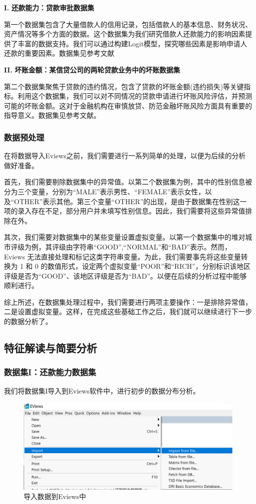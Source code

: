 \documentclass[13.5pt,hyperref,a4paper,UTF8]{ctexart}
\begin{document}
\quad \textbf{I.} \quad \textbf{还款能力：贷款审批数据集}

第一个数据集包含了大量借款人的信用记录，包括借款人的基本信息、财务状况、资产情况等多个方面的数据。这个数据集为我们研究借款人还款能力的影响因素提供了丰富的数据支持。我们可以通过构建Logit模型，探究哪些因素是影响申请人还款的重要因素。数据集见参考文献\cite{database1CH2}

\quad \textbf{II.} \quad  \textbf{坏账金额：某信贷公司的两轮贷款业务中的坏账数据集 }

第二个数据集聚焦于贷款的违约情况，包含了贷款的坏账金额(违约损失)等关键指标。利用这个数据集，我们可以对不同情况的贷款申请进行坏账风险评估，并预测可能的坏账金额。这对于金融机构在审慎放贷、防范金融坏账风险方面具有重要的指导意义。数据集见参考文献\cite{databse2CH2}。

\subsubsection{数据预处理}
在将数据导入Eviews之前，我们需要进行一系列简单的处理，以便为后续的分析做好准备。

首先，我们需要剔除数据集中的异常值。以第二个数据集为例，其中的性别信息被分为三个变量，分别为“MALE”表示男性、“FEMALE”表示女性，以及“OTHER”表示其他。第三个变量“OTHER”的出现，是由于数据集在性别这一项的录入存在不足，部分用户并未填写性别信息。因此，我们需要将这些异常值排除在外。

其次，我们需要对数据集中的某些变量设置虚拟变量。以第一个数据集中的堆对城市评级为例，其评级由字符串“GOOD”,“NORMAL”和“BAD”表示。然而，Eviews 无法直接处理和标记这类字符串变量。为此，我们需要事先将这些变量转换为 1 和 0 的数值形式，设定两个虚拟变量“POOR”和“RICH”，分别标识该地区评级是否为“GOOD”、该地区评级是否为“BAD”。以便在后续的分析过程中能够顺利进行。

综上所述，在数据集处理过程中，我们需要进行两项主要操作：一是排除异常值，二是设置虚拟变量。这样，在完成这些基础工作之后，我们就可以继续进行下一步的数据分析了。

\subsection{特征解读与简要分析}
\subsubsection{数据集I：还款能力数据集}

我们将数据集I导入到Eviews软件中，进行初步的数据分布分析。
\begin{figure}[!htbp]
    \centering
    \includegraphics[width =.8\textwidth]{figures/2DATABASE/IMPORTDATABSE.png}
    \caption{导入数据到Eviews中}
    \label{导入数据到Eviews中}
\end{figure}
\end{document}
